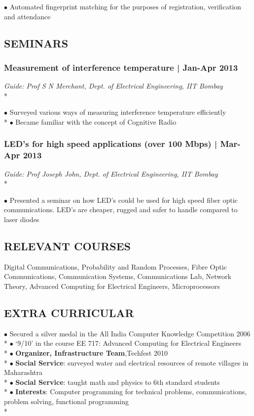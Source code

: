 \documentclass[12pt]{article}
\begin{document}
\noindent $\bullet$ Automated fingerprint matching for the purposes of registration, verification and attendance
 

\subsection*{\uppercase{Seminars}}
\subsubsection*{Measurement of interference temperature | Jan-Apr 2013} 

\emph{Guide: Prof S N Merchant, Dept. of Electrical Engineering, IIT Bombay} \\*
  
\noindent $\bullet$ Surveyed various ways of measuring interference temperature efficiently \\*
$\bullet$ Became familiar with the concept of Cognitive Radio
 

\subsubsection*{LED's for high speed applications (over 100 Mbps) | Mar-Apr 2013}

\emph{Guide: Prof Joseph John, Dept. of Electrical Engineering, IIT Bombay} \\*
  
\noindent $\bullet$ Presented a seminar on how LED's could be used for high speed fiber optic communications. LED's are cheaper, rugged and safer to handle compared to laser diodes
 

\subsection*{\uppercase{RELEVANT COURSES}}

Digital Communications, Probability and Random Processes, Fibre Optic Communications, 
Communication Systems, Communications Lab, Network Theory,
Advanced Computing for Electrical Engineers, Microprocessors

\subsection*{\uppercase{Extra curricular}}

  
\noindent $\bullet$ Secured a silver medal in the All India Computer Knowledge Competition 2006 \\*
$\bullet$ `9/10' in the course EE 717: Advanced Computing for Electrical Engineers \\*
$\bullet$ \textbf{Organizer, Infrastructure Team},Techfest 2010 \\*
$\bullet$ \textbf{Social Service}: surveyed water and electrical resources of remote villages in Maharashtra \\*
$\bullet$ \textbf{Social Service}: taught math and physics to 6th standard students \\*
$\bullet$ \textbf{Interests}:  Computer programming for technical problems, communications, problem solving, functional programming \\*
 
\end{document}
